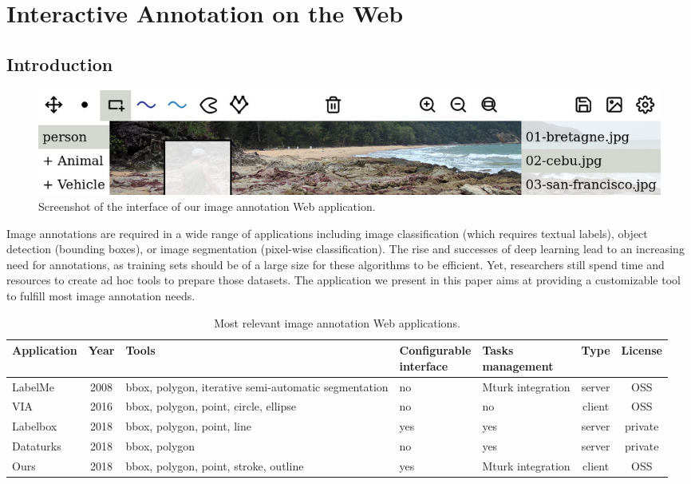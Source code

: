 \chapter{Interactive Annotation on the Web}%
\label{cha:interactive_annotation_on_the_web}

\lstset{language=haskell, style=CodeStyle}

\section{Introduction}

\begin{figure}[ht]
  \includegraphics[width=\textwidth]{assets/img/annotation-app-thin.jpg}
  \caption{Screenshot of the interface of our image annotation Web application.}%
  \label{fig:teaser}
\end{figure}

Image annotations are required in a wide range of applications
including image classification (which requires textual labels),
object detection (bounding boxes), or image segmentation (pixel-wise classification).
The rise and successes of deep learning lead to an increasing need for annotations,
as training sets should be of a large size for these algorithms to be efficient.
Yet, researchers still spend time and resources
to create ad hoc tools to prepare those datasets.
The application we present in this paper aims at providing a customizable tool
to fulfill most image annotation needs.

\begin{table}[ht]

\begin{tabular}{lclllcc}
Application
	& Year
    & Tools
    & \makecell[l]{Configurable\\interface}
    & \makecell[l]{Tasks\\management}
    & Type
    & License \\
    \midrule
LabelMe
	& 2008
    & bbox, polygon, iterative semi-automatic segmentation
    & no
    & Mturk integration
    & server
    & OSS \\
VIA
	& 2016
    & bbox, polygon, point, circle, ellipse
    & no
    & no
    & client
    & OSS \\
Labelbox
	& 2018
    & bbox, polygon, point, line
    & yes
    & yes
    & server
    & private \\
Dataturks
	& 2018
    & bbox, polygon
    & no
    & yes
    & server
    & private \\
Ours
	& 2018
    & bbox, polygon, point, stroke, outline
    & yes
    & Mturk integration
    & client
    & OSS \\
\end{tabular}

\caption{Most relevant image annotation Web applications.}%
\label{tab:web-apps}
\end{table}

